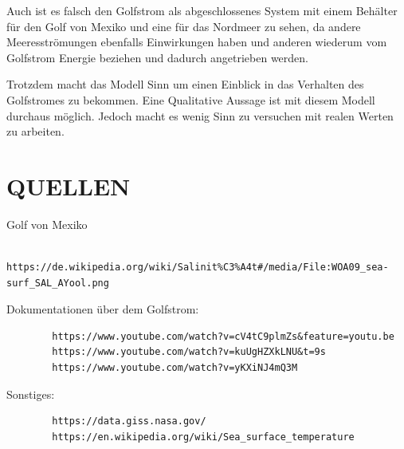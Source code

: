 \documentclass[a4paper,twoside]{article}
\begin{document}
	Auch ist es falsch den Golfstrom als abgeschlossenes System mit einem Behälter für den Golf von Mexiko und eine für das Nordmeer zu sehen, da andere Meeresströmungen ebenfalls Einwirkungen haben und anderen wiederum vom Golfstrom Energie beziehen und dadurch angetrieben werden.
	
	Trotzdem macht das Modell Sinn um einen Einblick in das Verhalten des Golfstromes zu bekommen. Eine Qualitative Aussage ist mit diesem Modell durchaus möglich. Jedoch macht es wenig Sinn zu versuchen mit realen Werten zu arbeiten. 
	
 	\section{\uppercase{Quellen}}\label{sec: Quellen}

	Golf von Mexiko
	\begin{verbatim}
	https://de.wikipedia.org/wiki/Salinit%C3%A4t#/media/File:WOA09_sea-surf_SAL_AYool.png
	\end{verbatim}		
	
	Dokumentationen über dem Golfstrom: 
	\begin{verbatim}
		https://www.youtube.com/watch?v=cV4tC9plmZs&feature=youtu.be
		https://www.youtube.com/watch?v=kuUgHZXkLNU&t=9s
		https://www.youtube.com/watch?v=yKXiNJ4mQ3M
  	\end{verbatim}		
	Sonstiges: 
	\begin{verbatim}
		https://data.giss.nasa.gov/
		https://en.wikipedia.org/wiki/Sea_surface_temperature
	\end{verbatim}
	
	\nocite{*}
	
	
\end{document}
